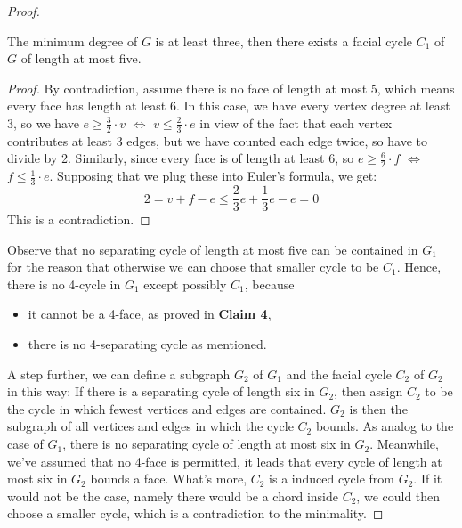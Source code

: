 \begin{proof}
\begin{lemma}
The minimum degree of $G$ is at least three, then there exists a facial cycle $C_1$ of $G$ of length at most five.
\end{lemma}

\begin{proof}
By contradiction, assume there is no face of length at
most 5, which means every face has length at least 6. In this case, we have every vertex degree at least 3, so we have $e \geq \frac{3}{2} \cdot v$ $\Longleftrightarrow$ $v \leq \frac{2}{3} \cdot e$ in view of the fact that each vertex contributes at least 3 edges, but we have counted each edge twice, so have to divide by 2. Similarly, since every face is of length at least 6, so $e \geq \frac{6}{2} \cdot f$ $\Longleftrightarrow$ $f \leq \frac{1}{3} \cdot e$. Supposing that we plug these into Euler's formula, we get:
\begin{equation*}
    2 = v + f - e \leq \frac{2}{3}e + \frac{1}{3}e - e = 0
\end{equation*}
This is a contradiction.
\end{proof}

Observe that no separating cycle of length at most five can be contained in $G_1$ for the reason that otherwise we can choose that smaller cycle to be $C_1$. Hence, there is no 4-cycle in $G_1$ except possibly $C_1$, because 
\begin{itemize}
    \item it cannot be a 4-face, as proved in \textbf{Claim 4},
    \item there is no 4-separating cycle as mentioned.
\end{itemize}
A step further, we can define a subgraph $G_2$ of $G_1$ and the facial cycle $C_2$ of $G_2$ in this way: If there is a separating cycle of length six in $G_2$, then assign $C_2$ to be the cycle in which fewest vertices and edges are contained. $G_2$ is then the subgraph of all vertices and edges in which the cycle $C_2$ bounds. As analog to the case of $G_1$, there is no separating cycle of length at most six in $G_2$. Meanwhile, we've assumed that no 4-face is permitted, it leads that every cycle of length at most six in $G_2$ bounds a face. What's more, $C_2$ is a induced cycle from $G_2$. If it would not be the case, namely there would be a chord inside $C_2$, we could then choose a smaller cycle, which is a contradiction to the minimality. 


\end{proof}
